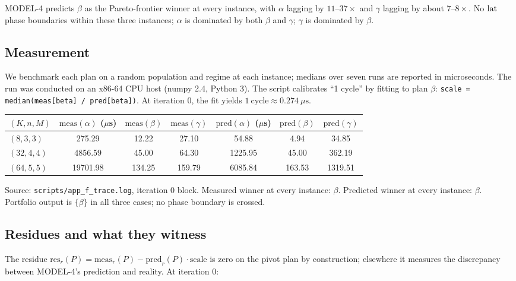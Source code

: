 MODEL-4 predicts $\beta$ as the Pareto-frontier winner
at every instance, with $\alpha$ lagging by $11\text{--}37\times$ and
$\gamma$ lagging by about $7\text{--}8\times$. No $\operatorname{lat}$ phase
boundaries within these three instances; $\alpha$ is
dominated by both $\beta$ and $\gamma$; $\gamma$ is
dominated by $\beta$.

\subsection{Measurement}\label{app-f:measure}

We benchmark each plan on a random population and
regime at each instance; medians over seven runs are
reported in microseconds. The run was conducted on an
x86-64 CPU host (numpy 2.4, Python 3). The script
calibrates ``1 cycle'' by fitting to plan $\beta$:
\verb|scale = median(meas[beta] / pred[beta])|. At
iteration 0, the fit yields $1~\text{cycle} \approx
0.274~\mu\text{s}$.

\begin{center}
\footnotesize
\begin{tabular}{l|ccc|ccc}
$(K, n, M)$ & $\mathrm{meas}(\alpha)$ ($\mu$s) & $\mathrm{meas}(\beta)$ & $\mathrm{meas}(\gamma)$
  & $\mathrm{pred}(\alpha)$ ($\mu$s) & $\mathrm{pred}(\beta)$ & $\mathrm{pred}(\gamma)$ \\
\hline
$(8, 3, 3)$    & 275.29     & 12.22     & 27.10     & 54.88  & 4.94   & 34.85   \\
$(32, 4, 4)$   & 4856.59    & 45.00     & 64.30     & 1225.95 & 45.00 & 362.19  \\
$(64, 5, 5)$   & 19701.98   & 134.25    & 159.79    & 6085.84 & 163.53 & 1319.51 \\
\end{tabular}
\end{center}

Source: \verb|scripts/app_f_trace.log|, iteration 0
block. Measured winner at every instance: $\beta$.
Predicted winner at every instance: $\beta$. Portfolio
output is $\{\beta\}$ in all three cases; no phase
boundary is crossed.

\subsection{Residues and what they witness}
\label{app-f:residues}

The residue $\mathrm{res}_r(P) = \mathrm{meas}_r(P) -
\mathrm{pred}_r(P) \cdot \mathrm{scale}$ is zero on
the pivot plan by construction; elsewhere it measures
the discrepancy between MODEL-4's prediction and
reality. At iteration 0:

